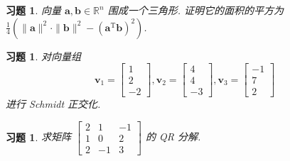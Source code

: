 \documentclass[UTF8]{ctexart}
\newtheorem{ex}[thm]{习题}
\begin{document}
\begin{ex}
  向量 \(\boldsymbol{a}, \boldsymbol{b} \in \mathbb{R}^n\)
  围成一个三角形. 证明它的面积的平方为
  \(\frac{1}{4}(\|\boldsymbol{a}\|^{2} \cdot \|\boldsymbol{b}\|^2 - (\boldsymbol{a}^{\mathrm{T}}\boldsymbol{b})^2)\).
\end{ex}

\begin{ex}
  对向量组
  \begin{equation*}
    \boldsymbol{v}_1 =
    \begin{bmatrix}
      1 \\ 2 \\ -2
    \end{bmatrix},
    \boldsymbol{v}_2 =
    \begin{bmatrix}
      4 \\ 4 \\-3
    \end{bmatrix},
    \boldsymbol{v}_3 =
    \begin{bmatrix}
      -1 \\ 7 \\ 2
    \end{bmatrix}
  \end{equation*}
  进行 Schmidt 正交化.
\end{ex}


\begin{ex}
  求矩阵 \(\begin{bmatrix} 2 & 1 & -1 \\ 1 & 0 & 2 \\ 2 & -1 & 3 \end{bmatrix}\) 的 QR 分解.
\end{ex}
\end{document}
